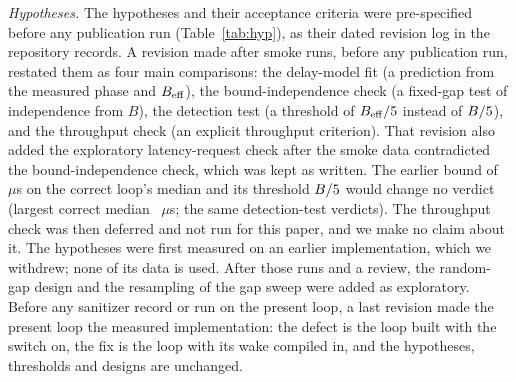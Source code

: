 \emph{Hypotheses.} The hypotheses and their acceptance criteria were pre-specified before any
publication run (Table~\ref{tab:hyp}), as their dated revision log in the repository records.
A revision made after smoke runs, before any publication run, restated them as four main
comparisons: the delay-model fit (a prediction from the measured phase and $B_{\mathrm{eff}}$), the
bound-independence check (a fixed-gap test of independence from $B$), the detection test (a
threshold of $B_{\mathrm{eff}}/5$ instead of $B/5$), and the throughput check
(an explicit throughput criterion). That revision also added the exploratory latency-request
check after the smoke data contradicted the bound-independence check, which was kept as
written. The earlier bound of \WakeHDroppedBoundUs~$\mu$s on the correct loop's median and its
threshold $B/5$ would change no verdict (largest correct median
\WakeFixedMedianMaxUs~$\mu$s; the same detection-test verdicts). The throughput check was then
deferred and not run for this paper, and we make no claim about it. The hypotheses were first
measured on an earlier implementation, which we withdrew; none of its data is used. After those
runs and a review, the random-gap design and the resampling of the gap sweep were added as
exploratory. Before any sanitizer record or run on the present loop, a last revision made the
present loop the measured implementation: the defect is the loop built with the switch on, the
fix is the loop with its wake compiled in, and the hypotheses, thresholds and designs are
unchanged.

